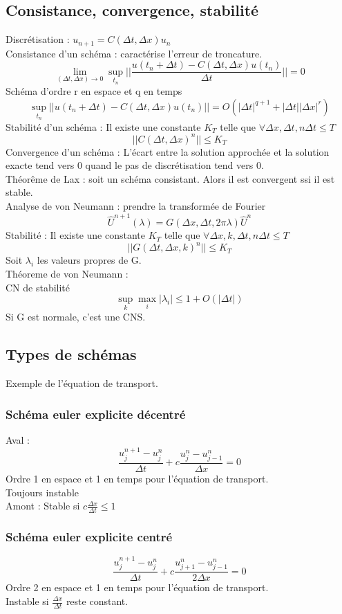\documentclass[12pt]{report}
\begin{document}
\subsection{Consistance, convergence, stabilit\'e}
Discr\'etisation : $u_{n+1}=C(\Delta t,\Delta x) u_n$\\
Consistance d'un sch\'ema : caract\'erise l'erreur de troncature.
$$\lim_{(\Delta t,\Delta x)\rightarrow 0} 
\sup_{t_n} ||\frac{u(t_n+\Delta t)-C(\Delta t,\Delta x)u(t_n)}{\Delta t}||=0 $$
Sch\'ema d'ordre r en espace et q en temps
$$\sup_{t_n} ||u(t_n+\Delta t)-C(\Delta t,\Delta x)u(t_n)||=
O(|\Delta t|^{q+1}+
|\Delta t| |\Delta x |^r) $$
Stabilit\'e d'un sch\'ema :
Il existe une constante $K_T$ telle que 
$\forall \Delta x, \Delta t, n \Delta t \le T$
$$|| C(\Delta t,\Delta x)^n|| \le K_T$$
Convergence d'un sch\'ema :
L'\'ecart entre la solution approch\'ee et la solution exacte tend vers 0 quand le
pas de discr\'etisation tend vers 0.\\
Th\'eor\^eme de Lax : soit un sch\'ema consistant. Alors il est convergent ssi il est
stable.\\
Analyse de von Neumann : prendre la transform\'ee de Fourier 
$$\hat{U}^{n+1}(\lambda)=G(\Delta x, \Delta t, 2\pi \lambda) \hat{U}^n $$
Stabilit\'e :
Il existe une constante $K_T$ telle que 
$\forall \Delta x, k, \Delta t, n \Delta t \le T$
$$|| G(\Delta t,\Delta x,k)^n|| \le K_T$$
Soit $\lambda_i$ les valeurs propres de G.\\
Th\'eoreme de von Neumann : \\
CN de stabilit\'e 
$$\sup_k \max_i |\lambda_i| \le 1+O(|\Delta t|) $$
Si G est normale, c'est une CNS.

\subsection{Types de schémas}
Exemple de l'équation de transport.
\subsubsection{Sch\'ema euler explicite décentré}
Aval :
$$\frac{u_j^{n+1}- u_j^n}{\Delta t} +c \frac{u_j^n- u_{j-1}^n}{\Delta x}=0$$
Ordre 1 en espace et 1 en temps pour l'équation de transport.\\
Toujours instable\\
Amont :
Stable si $c \frac{\Delta x}{\Delta t} \le 1$

\subsubsection{Sch\'ema euler explicite centré}
$$\frac{u_j^{n+1}- u_j^n}{\Delta t} +
c \frac{u_{j+1}^n- u_{j-1}^n}{2 \Delta x}=0$$
Ordre 2 en espace et 1 en temps pour l'équation de transport.\\
Instable si $\frac{\Delta x}{\Delta t}$ reste constant.
\end{document}

